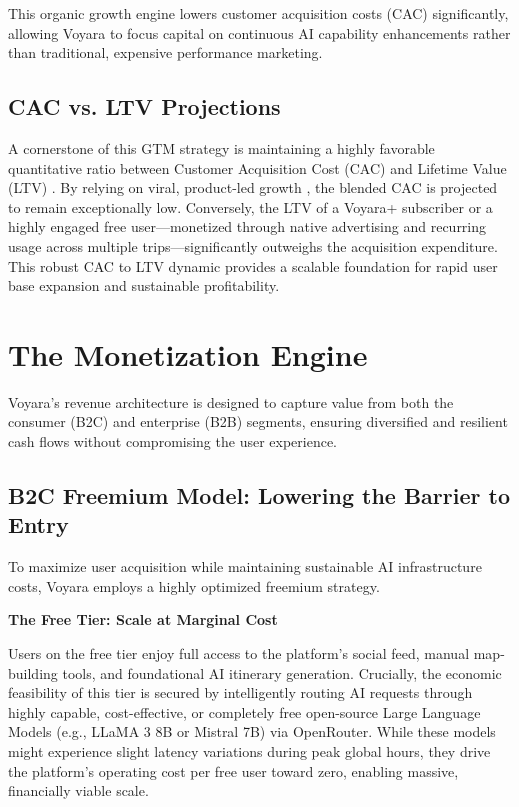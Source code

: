 This organic growth engine lowers customer acquisition costs (CAC) significantly, allowing Voyara to focus capital on continuous AI capability enhancements rather than traditional, expensive performance marketing. 

\subsection{CAC vs. LTV Projections}
A cornerstone of this GTM strategy is maintaining a highly favorable quantitative ratio between Customer Acquisition Cost (CAC) and Lifetime Value (LTV) \cite{cac_ltv_metrics}. By relying on viral, product-led growth \cite{plg_strategy}, the blended CAC is projected to remain exceptionally low. Conversely, the LTV of a Voyara+ subscriber or a highly engaged free user—monetized through native advertising and recurring usage across multiple trips—significantly outweighs the acquisition expenditure. This robust CAC to LTV dynamic provides a scalable foundation for rapid user base expansion and sustainable profitability.

\section{The Monetization Engine}
Voyara's revenue architecture is designed to capture value from both the consumer (B2C) and enterprise (B2B) segments, ensuring diversified and resilient cash flows without compromising the user experience.

\subsection{B2C Freemium Model: Lowering the Barrier to Entry}
To maximize user acquisition while maintaining sustainable AI infrastructure costs, Voyara employs a highly optimized freemium strategy.

\textbf{The Free Tier: Scale at Marginal Cost}

Users on the free tier enjoy full access to the platform's social feed, manual map-building tools, and foundational AI itinerary generation. Crucially, the economic feasibility of this tier is secured by intelligently routing AI requests through highly capable, cost-effective, or completely free open-source Large Language Models (e.g., LLaMA 3 8B or Mistral 7B) via OpenRouter. While these models might experience slight latency variations during peak global hours, they drive the platform's operating cost per free user toward zero, enabling massive, financially viable scale.

